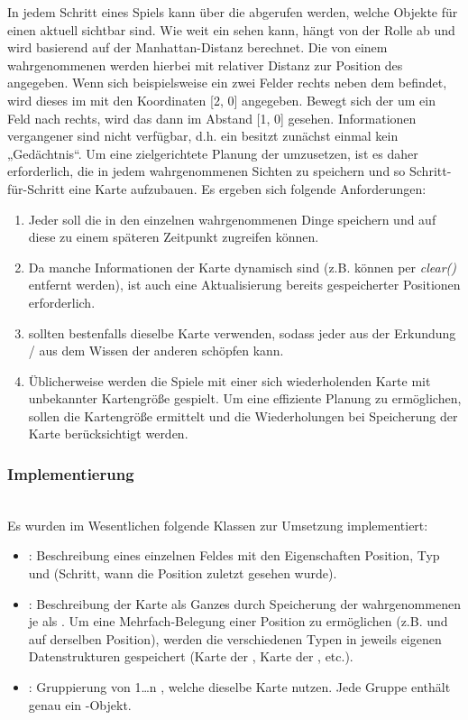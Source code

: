 In jedem Schritt eines Spiels kann über die \Percepts abgerufen werden, welche Objekte für einen \Agent aktuell sichtbar sind. Wie weit ein \Agent sehen kann, hängt von der Rolle ab und wird basierend auf der Manhattan-Distanz berechnet. Die von einem \Agent wahrgenommenen \Things werden hierbei mit relativer Distanz zur Position des \Agents angegeben. Wenn sich beispielsweise ein \Obstacle zwei Felder rechts neben dem \Agent befindet, wird dieses im \Percept mit den Koordinaten [2, 0] angegeben. Bewegt sich der \Agent um ein Feld nach rechts, wird das \Obstacle dann im Abstand [1, 0] gesehen. Informationen vergangener \Percepts sind nicht verfügbar, d.h. ein \Agent besitzt zunächst einmal kein „Gedächtnis“. Um eine zielgerichtete Planung der \Agents umzusetzen, ist es daher erforderlich, die in jedem \Step wahrgenommenen Sichten zu speichern und so Schritt-für-Schritt eine Karte aufzubauen. Es ergeben sich folgende Anforderungen:
\begin{enumerate}
\item Jeder \Agent soll die in den einzelnen \Steps wahrgenommenen Dinge speichern und auf diese zu einem späteren Zeitpunkt zugreifen können. 
\item Da manche Informationen der Karte dynamisch sind (z.B. können \Obstacles per \textit{clear()} entfernt werden), ist auch eine Aktualisierung bereits gespeicherter Positionen erforderlich. 
\item \Agents sollten bestenfalls dieselbe Karte verwenden, sodass jeder \Agent aus der Erkundung / aus dem Wissen der anderen \Agents schöpfen kann.
\item Üblicherweise werden die Spiele mit einer sich wiederholenden Karte mit unbekannter Kartengröße gespielt. Um eine effiziente Planung zu ermöglichen, sollen die Kartengröße ermittelt und die Wiederholungen bei Speicherung der Karte berücksichtigt werden.
\end{enumerate}

\subsubsection{Implementierung} ~\\
Es wurden im Wesentlichen folgende Klassen zur Umsetzung implementiert:
\begin{itemize}
\item \NextMapTile: Beschreibung eines einzelnen Feldes mit den Eigenschaften Position, Typ und \Step (Schritt, wann die Position zuletzt gesehen wurde).   
\item \NextMap: Beschreibung der Karte als Ganzes durch Speicherung der wahrgenommenen \Things je \Step als \NextMapTiles. Um eine Mehrfach-Belegung einer Position zu ermöglichen (z.B. \GoalZone und \Obstacle auf derselben Position), werden die verschiedenen Typen in jeweils eigenen Datenstrukturen gespeichert (Karte der \Obstacles, Karte der \GoalZones, etc.).
\item \NextGroup: Gruppierung von 1…n \Agents, welche dieselbe Karte nutzen. Jede Gruppe enthält genau ein \NextMap-Objekt. 
\end{itemize}

